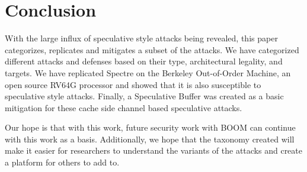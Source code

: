 \section{Conclusion}

With the large influx of speculative style attacks being revealed, this paper categorizes,
replicates and mitigates a subset of the attacks. We have categorized different attacks 
and defenses based on their type, architectural legality, and targets. We have replicated 
Spectre on the Berkeley Out-of-Order Machine, an open source RV64G processor and showed 
that it is also susceptible to speculative style attacks. Finally, a Speculative Buffer 
was created as a basic mitigation for these cache side channel based speculative attacks.

Our hope is that with this work, future security work with BOOM can continue with this 
work as a basis. Additionally, we hope that the taxonomy created will make it easier
for researchers to understand the variants of the attacks and create a platform for others
to add to.

